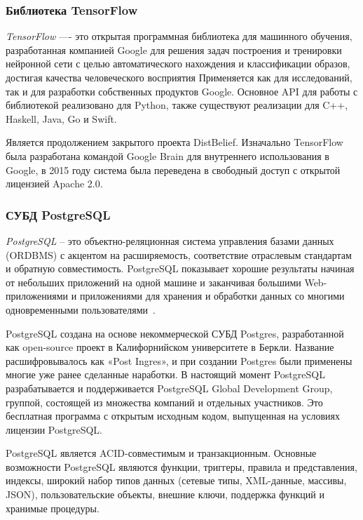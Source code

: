 \subsubsection{Библиотека TensorFlow}
\label{sec:techs:tensor_flow}
\emph{TensorFlow} —- это открытая программная библиотека для машинного обучения, разработанная компанией Google для решения задач построения и тренировки нейронной сети с целью автоматического нахождения и классификации образов, достигая качества человеческого восприятия Применяется как для исследований, так и для разработки собственных продуктов Google. Основное API для работы с библиотекой реализовано для Python, также существуют реализации для C++, Haskell, Java, Go и Swift.

Является продолжением закрытого проекта DistBelief. Изначально TensorFlow была разработана командой Google Brain для внутреннего использования в Google, в 2015 году система была переведена в свободный доступ с открытой лицензией Apache 2.0.

\subsubsection{СУБД PostgreSQL}
\label{sec:techs:postgresql}
\emph{PostgreSQL} -- это объектно-реляционная система управления базами данных (ORDBMS) с акцентом на расширяемость, соответствие отраслевым стандартам и обратную совместимость. PostgreSQL показывает хорошие результаты начиная от небольших приложений на одной машине и заканчивая большими Web-приложениями и приложениями для хранения и обработки данных со многими одновременными пользователями~\cite{postgres}.

PostgreSQL создана на основе некоммерческой СУБД Postgres, разработанной как open-source проект в Калифорнийском университете в Беркли. Название расшифровывалось как «Post Ingres», и при создании Postgres были применены многие уже ранее сделанные наработки. В настоящий момент PostgreSQL разрабатывается и поддерживается PostgreSQL Global Development Group, группой, состоящей из множества компаний и отдельных участников. Это бесплатная программа с открытым исходным кодом, выпущенная на условиях лицензии PostgreSQL.

PostgreSQL является ACID-совместимым и транзакционным. Основные возможности PostgreSQL являются функции, триггеры, правила и представления, индексы, широкий набор типов данных (сетевые типы, XML-данные, массивы, JSON), пользовательские объекты, внешние ключи, поддержка функций и хранимые процедуры.

